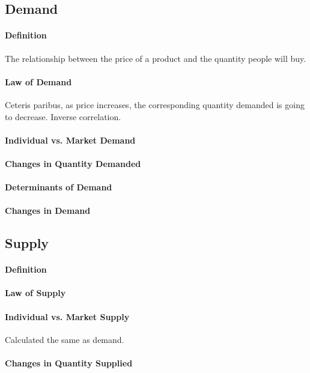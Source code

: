 \subsection{Demand}
\paragraph{Definition} The relationship between the price of a product and the quantity people will buy.

\paragraph{Law of Demand} %
Ceteris paribus, as price increases, the corresponding quantity demanded is going to decrease. Inverse correlation.

\paragraph{Individual vs. Market Demand} %
\paragraph{Changes in Quantity Demanded} %
\paragraph{Determinants of Demand}
\paragraph{Changes in Demand} %

\subsection{Supply}
\paragraph{Definition}
\paragraph{Law of Supply} %
\paragraph{Individual vs. Market Supply}
Calculated the same as demand.
\paragraph{Changes in Quantity Supplied} %
